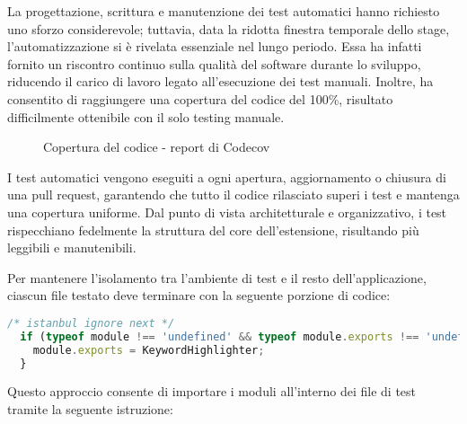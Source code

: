 \vspace{10pt}
\par\noindent La progettazione, scrittura e manutenzione dei test automatici hanno richiesto uno sforzo considerevole; tuttavia, data la ridotta finestra temporale dello stage, l’automatizzazione si è rivelata essenziale nel lungo periodo. Essa ha infatti fornito un riscontro continuo sulla qualità del software durante lo sviluppo, riducendo il carico di lavoro legato all’esecuzione dei test manuali. Inoltre, ha consentito di raggiungere una copertura del codice del 100\%, risultato difficilmente ottenibile con il solo testing manuale.

\begin{figure}[H]
  \centering 
  \caption{Copertura del codice - report di Codecov}
\end{figure}

\par\noindent I test automatici vengono eseguiti a ogni apertura, aggiornamento o chiusura di una pull request, garantendo che tutto il codice rilasciato superi i test e mantenga una copertura uniforme. Dal punto di vista architetturale e organizzativo, i test rispecchiano fedelmente la struttura del core dell’estensione, risultando più leggibili e manutenibili. 

\vspace{10pt}
\begin{samepage}
\end{samepage}

\vspace{10pt}
\par\noindent Per mantenere l’isolamento tra l’ambiente di test e il resto dell’applicazione, ciascun file testato deve terminare con la seguente porzione di codice:

\vspace{10pt}
\begin{samepage}
\begin{lstlisting}[language=JavaScript]
  /* istanbul ignore next */
  if (typeof module !== 'undefined' && typeof module.exports !== 'undefined') {
    module.exports = KeywordHighlighter;
  }
\end{lstlisting}
\end{samepage}

\vspace{10pt}
\par\noindent Questo approccio consente di importare i moduli all’interno dei file di test tramite la seguente istruzione:

